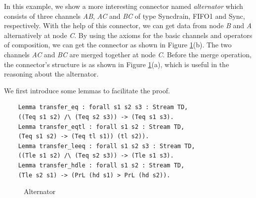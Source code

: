 \documentclass{llncs}
\begin{document}
\begin{example}\label{ex:alternator}
In this example, we show a more interesting connector named \emph{alternator} which consists of three channels \emph{AB}, \emph{AC} and \emph{BC} of type Syncdrain, FIFO1 and Sync, respectively. With the help of this connector, we can get data from node \emph{B} and \emph{A} alternatively at node \emph{C}.
By using the axioms for the basic channels and operators of composition, we can get the connector as shown in Figure \ref{fig:alternator}(b). The two
channels \emph{AC} and \emph{BC} are merged together at node \emph{C}. Before the merge operation, the connector's structure is as shown in
Figure \ref{fig:alternator}(a), which is useful in the reasoning about the alternator.


We first introduce some lemmas to facilitate the proof.
\begin{verbatim}
    Lemma transfer_eq : forall s1 s2 s3 : Stream TD,
    ((Teq s1 s2) /\ (Teq s2 s3)) -> (Teq s1 s3).
    Lemma transfer_eqtl : forall s1 s2 : Stream TD,
    (Teq s1 s2) -> (Teq tl s1)) (tl s2)).
    Lemma transfer_leeq : forall s1 s2 s3 : Stream TD,
    ((Tle s1 s2) /\ (Teq s2 s3)) -> (Tle s1 s3).
    Lemma transfer_hdle : forall s1 s2 : Stream TD,
    (Tle s2 s1) -> (PrL (hd s1) > PrL (hd s2)).
\end{verbatim}

\begin{figure}
\vspace{0cm}
\centering
{}
\caption{Alternator}
\label{fig:alternator}
\end{figure}


\end{example}
\end{document}
